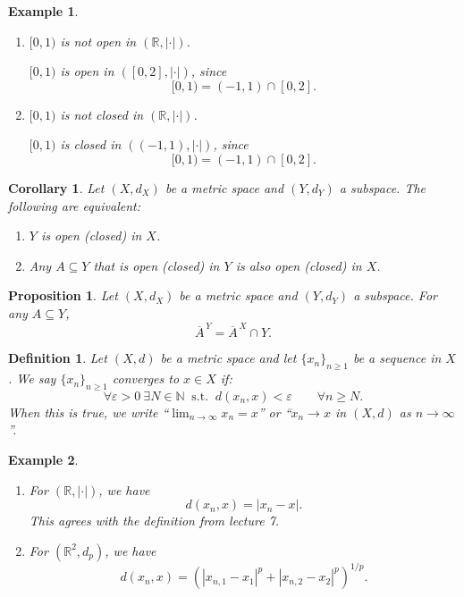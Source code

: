 \documentclass[12pt]{article}
\newtheorem{proposition}{Proposition}
\newtheorem{corollary}{Corollary}
\newtheorem{definition}{Definition}
\newtheorem{example}{Example}
\begin{document}
\begin{example}
\begin{enumerate}[label=\textbf{(\arabic*)}]
  \item $[0,1)$ is not open in $(\mathbb{R},|\cdot|)$.

  $[0,1)$ is open in $([0,2],|\cdot|)$, since
  \[
  [0,1)=(-1,1)\cap[0,2].
  \]
  \item $[0,1)$ is not closed in $(\mathbb{R},|\cdot|)$.

  $[0,1)$ is closed in $((-1,1),|\cdot|)$, since
  \[
  [0,1)=(-1,1)\cap[0,2].
  \]
\end{enumerate}
\end{example}

\begin{corollary}
Let $(X,d_X)$ be a metric space and $(Y,d_Y)$ a subspace. The following are
equivalent:
\begin{enumerate}[label=\textbf{(\arabic*)}]
  \item $Y$ is open (closed) in $X$.
  \item Any $A\subseteq Y$ that is open (closed) in $Y$ is also open (closed)
  in $X$.
\end{enumerate}
\end{corollary}

\begin{proposition}
Let $(X,d_X)$ be a metric space and $(Y,d_Y)$ a subspace. For any $A\subseteq Y$,
\[
\overline{A}^{\,Y}=\overline{A}^{\,X}\cap Y.
\]
\end{proposition}

\begin{definition}
Let $(X,d)$ be a metric space and let $\{x_n\}_{n\ge 1}$ be a sequence in $X$.
We say $\{x_n\}_{n\ge 1}$ converges to $x\in X$ if:
\[
\forall \varepsilon>0\ \exists N\in\mathbb{N}\ \text{ s.t. }\ d(x_n,x)<\varepsilon
\qquad \forall n\ge N.
\]
When this is true, we write ``$\lim_{n\to\infty} x_n=x$'' or
``$x_n\to x$ in $(X,d)$ as $n\to\infty$''.
\end{definition}

\begin{example}
\begin{enumerate}[label=\textbf{(\arabic*)}]
  \item For $(\mathbb{R},|\cdot|)$, we have
  \[
  d(x_n,x)=|x_n-x|.
  \]
  This agrees with the definition from lecture 7.
  \item For $(\mathbb{R}^2,d_p)$, we have
  \[
  d(x_n,x)=\left(|x_{n,1}-x_1|^p+|x_{n,2}-x_2|^p\right)^{1/p}.
  \]
\end{enumerate}
\end{example}
\end{document}
